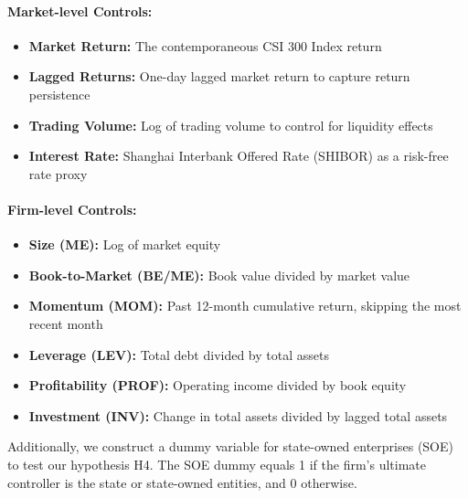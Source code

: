 \documentclass[preprint,12pt,authoryear]{elsarticle}
\begin{document}
\paragraph{Market-level Controls:}
\begin{itemize}
\item \textbf{Market Return:} The contemporaneous CSI 300 Index return
\item \textbf{Lagged Returns:} One-day lagged market return to capture return persistence
\item \textbf{Trading Volume:} Log of trading volume to control for liquidity effects
\item \textbf{Interest Rate:} Shanghai Interbank Offered Rate (SHIBOR) as a risk-free rate proxy
\end{itemize}

\paragraph{Firm-level Controls:}
\begin{itemize}
\item \textbf{Size (ME):} Log of market equity
\item \textbf{Book-to-Market (BE/ME):} Book value divided by market value
\item \textbf{Momentum (MOM):} Past 12-month cumulative return, skipping the most recent month
\item \textbf{Leverage (LEV):} Total debt divided by total assets
\item \textbf{Profitability (PROF):} Operating income divided by book equity
\item \textbf{Investment (INV):} Change in total assets divided by lagged total assets
\end{itemize}

Additionally, we construct a dummy variable for state-owned enterprises (SOE) to test our hypothesis H4. The SOE dummy equals 1 if the firm's ultimate controller is the state or state-owned entities, and 0 otherwise.
\end{document}
